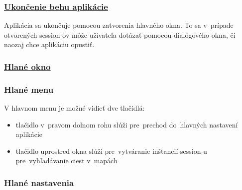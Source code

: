 \documentclass[12pt,a4paper]{report}
\begin{document}
\subsubsection{\underline{Ukončenie behu aplikácie}}

Aplikácia sa ukončuje pomocou zatvorenia hlavného okna. To sa v~prípade otvorených session-ov môže užívateľa dotázať pomocou dialógového okna, či naozaj chce aplikáciu opustiť.

\pagebreak

\subsubsection{\underline{Hlané okno}}

\subsubsection{Hlané menu}

\begin{figure}[h]\centering
{}
\end{figure}

V hlavnom menu je možné vidieť dve tlačidlá:
\begin{itemize}
    \item tlačidlo v~pravom dolnom rohu slúži pre~prechod do~hlavných nastavení aplikácie
    \item tlačidlo uprostred okna slúži pre~vytváranie inštancií session-u pre~vyhľadávanie ciest v~mapách
\end{itemize}

\subsubsection{Hlané nastavenia}

\begin{figure}[h]\centering
{}
\end{figure}
\end{document}
